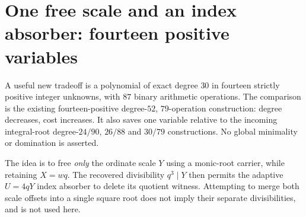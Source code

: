 \section{One free scale and an index absorber: fourteen positive variables}
\label{sec:positive30}

A useful new tradeoff is a polynomial of exact degree $30$ in fourteen
strictly positive integer unknowns, with $87$ binary arithmetic operations.
The comparison is the existing fourteen-positive degree-$52$, $79$-operation
construction: degree decreases, cost increases. It also saves one variable
relative to the incoming integral-root degree-$24/90$, $26/88$ and $30/79$
constructions. No global minimality or domination is asserted.

The idea is to free \emph{only} the ordinate scale $Y$ using a monic-root
carrier, while retaining $X=wq$. The recovered divisibility $q^3\mid Y$
then permits the adaptive $U=4qY$ index absorber to delete its quotient
witness. Attempting to merge both scale offsets into a single square root
does not imply their separate divisibilities, and is not used here.


